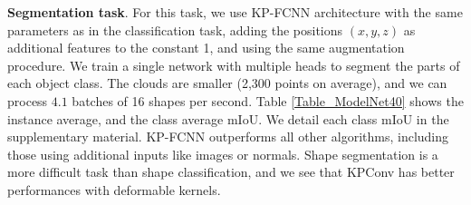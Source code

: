 \documentclass[10pt,twocolumn,letterpaper]{article}
\begin{document}
\noindent
\textbf{Segmentation task}. For this task, we use KP-FCNN architecture with the same parameters as in the classification task, adding the positions $(x, y, z)$ as additional features to the constant 1, and using the same augmentation procedure. We train a single network with multiple heads to segment the parts of each object class. The clouds are smaller (2,300 points on average), and we can process $4.1$ batches of 16 shapes per second. Table \ref{Table_ModelNet40} shows the instance average, and the class average mIoU. We detail each class mIoU in the supplementary material. KP-FCNN outperforms all other algorithms, including those using additional inputs like images or normals. Shape segmentation is a more difficult task than shape classification, and we see that KPConv has better performances with deformable kernels.
\end{document}
